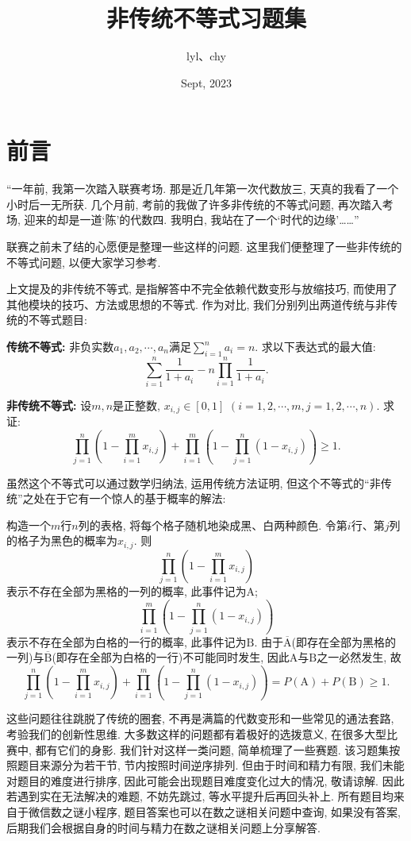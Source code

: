 \documentclass[lang=cn,10pt]{elegantbook}
\title{非传统不等式习题集}
\author{lyl、chy}
\date{Sept, 2023}
\begin{document}
\maketitle
\frontmatter



\mainmatter

\chapter*{前言}

{\kaishu “一年前, 我第一次踏入联赛考场. 那是近几年第一次代数放三, 天真的我看了一个小时后一无所获. 几个月前, 考前的我做了许多非传统的不等式问题, 再次踏入考场, 迎来的却是一道‘陈’的代数四. 我明白, 我站在了一个‘时代的边缘’……”}\par
联赛之前未了结的心愿便是整理一些这样的问题. 这里我们便整理了一些非传统的不等式问题, 以便大家学习参考.\par
上文提及的非传统不等式, 是指解答中不完全依赖代数变形与放缩技巧, 而使用了其他模块的技巧、方法或思想的不等式. 作为对比, 我们分别列出两道传统与非传统的不等式题目:\par
\textbf{传统不等式: }{\kaishu 非负实数$a_1,a_2,\cdots,a_n$满足$\sum_{i=1}^{n}a_i=n$. 求以下表达式的最大值:
\[\sum_{i=1}^n\frac{1}{1+a_i}-n\prod_{i=1}^n\frac{1}{1+a_i}.\]
}\par
\textbf{非传统不等式: }{\kaishu 设$m, n$是正整数, $x_{i,j}\in[0,1]$ $(i=1,2,\cdots,m,j=1,2,
\cdots,n)$. 求证:
\[\prod_{j=1}^n\left(1-\prod_{i=1}^m x_{i,j}\right)+\prod_{i=1}^m\left(1-\prod_{j=1}^n (1-x_{i,j})\right)\ge 1.\]}\par
虽然这个不等式可以通过数学归纳法, 运用传统方法证明, 但这个不等式的“非传统”之处在于它有一个惊人的基于概率的解法:\par
{\kaishu 构造一个$m$行$n$列的表格, 将每个格子随机地染成黑、白两种颜色. 令第$i$行、第$j$列的格子为黑色的概率为$x_{i,j}$. 则
\[\prod_{j=1}^n\left(1-\prod_{i=1}^m x_{i,j}\right)\]
表示不存在全部为黑格的一列的概率, 此事件记为$\mathrm{A}$;
\[\prod_{i=1}^m\left(1-\prod_{j=1}^n (1-x_{i,j})\right)\]
表示不存在全部为白格的一行的概率, 此事件记为$\mathrm{B}$. 由于$\overline{\mathrm{A}}$(即存在全部为黑格的一列)与$\overline{\mathrm{B}}$(即存在全部为白格的一行)不可能同时发生, 因此$\mathrm{A}$与$\mathrm{B}$之一必然发生, 故
\[\prod_{j=1}^n\left(1-\prod_{i=1}^m x_{i,j}\right)+\prod_{i=1}^m\left(1-\prod_{j=1}^n (1-x_{i,j})\right)=P(\mathrm{A})+P(\mathrm{B})\ge 1.\]}\par
这些问题往往跳脱了传统的圈套, 不再是满篇的代数变形和一些常见的通法套路, 考验我们的创新性思维. 大多数这样的问题都有着极好的选拨意义, 在很多大型比赛中, 都有它们的身影. 我们针对这样一类问题, 简单梳理了一些赛题. 该习题集按照题目来源分为若干节, 节内按照时间逆序排列. 但由于时间和精力有限, 我们未能对题目的难度进行排序, 因此可能会出现题目难度变化过大的情况, 敬请谅解. 因此若遇到实在无法解决的难题, 不妨先跳过, 等水平提升后再回头补上. 所有题目均来自于微信数之谜小程序, 题目答案也可以在数之谜相关问题中查询, 如果没有答案, 后期我们会根据自身的时间与精力在数之谜相关问题上分享解答.\par
\end{document}
